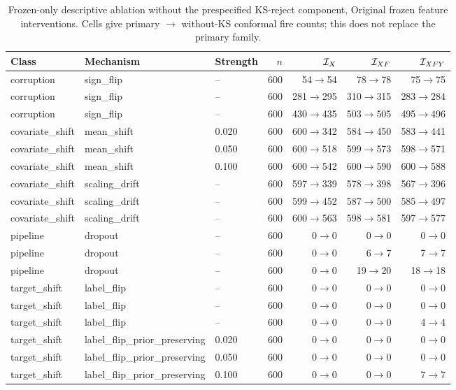 \begin{table}[!t]
\caption{Frozen-only descriptive ablation without the prespecified KS-reject component, Original frozen feature interventions. Cells give primary $\rightarrow$ without-KS conformal fire counts; this does not replace the primary family.}
\label{tab:v137-without-ks-1}
\centering\footnotesize\renewcommand{\arraystretch}{0.90}\setlength{\tabcolsep}{4pt}
\begin{tabular}{@{}lllrrrr@{}}
\toprule
Class & Mechanism & Strength & $n$ & $\mathcal I_X$ & $\mathcal I_{XF}$ & $\mathcal I_{XFY}$ \\
\midrule
corruption & sign\_flip & -- & 600 & 54$\rightarrow$54 & 78$\rightarrow$78 & 75$\rightarrow$75 \\
corruption & sign\_flip & -- & 600 & 281$\rightarrow$295 & 310$\rightarrow$315 & 283$\rightarrow$284 \\
corruption & sign\_flip & -- & 600 & 430$\rightarrow$435 & 503$\rightarrow$505 & 495$\rightarrow$496 \\
covariate\_shift & mean\_shift & 0.020 & 600 & 600$\rightarrow$342 & 584$\rightarrow$450 & 583$\rightarrow$441 \\
covariate\_shift & mean\_shift & 0.050 & 600 & 600$\rightarrow$518 & 599$\rightarrow$573 & 598$\rightarrow$571 \\
covariate\_shift & mean\_shift & 0.100 & 600 & 600$\rightarrow$542 & 600$\rightarrow$590 & 600$\rightarrow$588 \\
covariate\_shift & scaling\_drift & -- & 600 & 597$\rightarrow$339 & 578$\rightarrow$398 & 567$\rightarrow$396 \\
covariate\_shift & scaling\_drift & -- & 600 & 599$\rightarrow$452 & 587$\rightarrow$500 & 585$\rightarrow$497 \\
covariate\_shift & scaling\_drift & -- & 600 & 600$\rightarrow$563 & 598$\rightarrow$581 & 597$\rightarrow$577 \\
pipeline & dropout & -- & 600 & 0$\rightarrow$0 & 0$\rightarrow$0 & 0$\rightarrow$0 \\
pipeline & dropout & -- & 600 & 0$\rightarrow$0 & 6$\rightarrow$7 & 7$\rightarrow$7 \\
pipeline & dropout & -- & 600 & 0$\rightarrow$0 & 19$\rightarrow$20 & 18$\rightarrow$18 \\
target\_shift & label\_flip & -- & 600 & 0$\rightarrow$0 & 0$\rightarrow$0 & 0$\rightarrow$0 \\
target\_shift & label\_flip & -- & 600 & 0$\rightarrow$0 & 0$\rightarrow$0 & 0$\rightarrow$0 \\
target\_shift & label\_flip & -- & 600 & 0$\rightarrow$0 & 0$\rightarrow$0 & 4$\rightarrow$4 \\
target\_shift & label\_flip\_prior\_preserving & 0.020 & 600 & 0$\rightarrow$0 & 0$\rightarrow$0 & 0$\rightarrow$0 \\
target\_shift & label\_flip\_prior\_preserving & 0.050 & 600 & 0$\rightarrow$0 & 0$\rightarrow$0 & 0$\rightarrow$0 \\
target\_shift & label\_flip\_prior\_preserving & 0.100 & 600 & 0$\rightarrow$0 & 0$\rightarrow$0 & 7$\rightarrow$7 \\
\bottomrule
\end{tabular}
\end{table}

